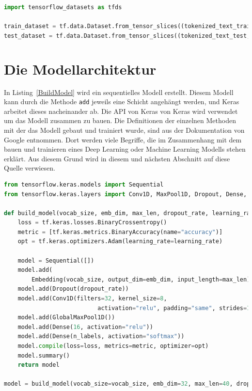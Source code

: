 \begin{lstlisting}[language=Python,caption=Die Dataset Erstellung, label={DataSet}]
import tensorflow_datasets as tfds

train_dataset = tf.data.Dataset.from_tensor_slices((tokenized_text_train, y))
test_dataset = tf.data.Dataset.from_tensor_slices((tokenized_text_test, y_test))
\end{lstlisting}





\section{Die Modellarchitektur}



In Listing~\ref{BuildModel} wird ein sequentielles Modell erstellt. Diesem Modell kann durch die Methode \texttt{add} jeweils eine Schicht angehängt werden, und Keras arbeitet dieses nacheinander ab. Die API von Keras von Keras wird verwendet um das Modell zusammen zu bauen. Die Definitionen der einzelnen Methoden mit der das Modell gebaut und trainiert wurde, sind aus der Dokumentation von Google\citep{google1} entnommen. Dort werden viele Begriffe, die im Zusammenhang mit dem bauen und trainieren eines Deep Learning oder Machine Learning Modells stehen erklärt. Aus diesem Grund wird in diesem und nächsten Abschnitt auf diese Quelle verwiesen.

\begin{lstlisting}[language=Python,caption=Das Bilden des Models, label={BuildModel}]
from tensorflow.keras.models import Sequential
from tensorflow.keras.layers import Conv1D, MaxPool1D, Dropout, Dense, GlobalMaxPool1D, Embedding, Activation

def build_model(vocab_size, emb_dim, max_len, dropout_rate, learning_rate, n_labels):
    loss = tf.keras.losses.BinaryCrossentropy()
    metric = [tf.keras.metrics.BinaryAccuracy(name="accuracy")]
    opt = tf.keras.optimizers.Adam(learning_rate=learning_rate)

    model = Sequential([])
    model.add(
        Embedding(vocab_size, output_dim=emb_dim, input_length=max_len))
    model.add(Dropout(dropout_rate))
    model.add(Conv1D(filters=32, kernel_size=8,
                           activation="relu", padding="same", strides=1))
    model.add(GlobalMaxPool1D())
    model.add(Dense(16, activation="relu"))
    model.add(Dense(n_labels, activation="softmax"))
    model.compile(loss=loss, metrics=metric, optimizer=opt)
    model.summary()
    return model
    
model = build_model(vocab_size=vocab_size, emb_dim=32, max_len=40, dropout_rate=0.3, learning_rate=0.00006, n_labels=len(labels))
\end{lstlisting}


